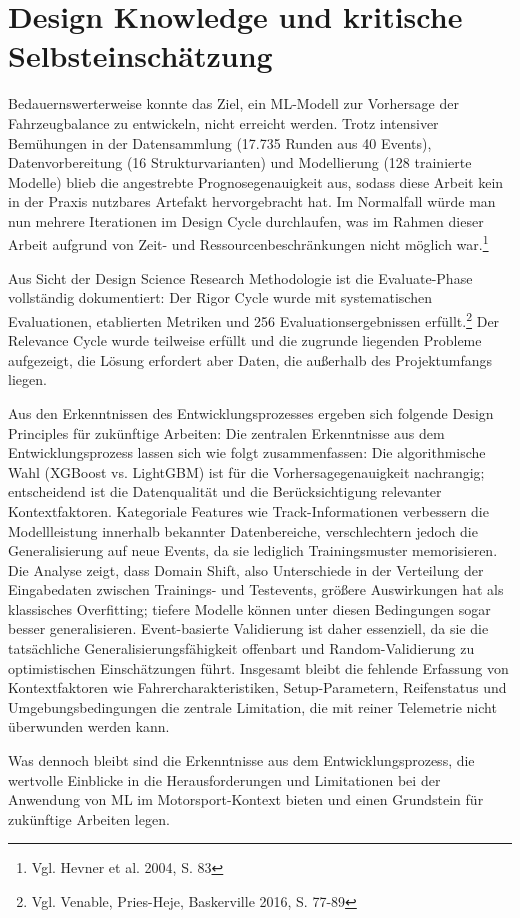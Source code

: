 \section{Design Knowledge und kritische Selbsteinschätzung}

Bedauernswerterweise konnte das Ziel, ein ML-Modell zur Vorhersage der Fahrzeugbalance zu entwickeln, nicht erreicht werden. Trotz intensiver Bemühungen in der Datensammlung (17.735 Runden aus 40 Events), Datenvorbereitung (16 Strukturvarianten) und Modellierung (128 trainierte Modelle) blieb die angestrebte Prognosegenauigkeit aus, sodass diese Arbeit kein in der Praxis nutzbares Artefakt hervorgebracht hat. Im Normalfall würde man nun mehrere Iterationen im Design Cycle durchlaufen, was im Rahmen dieser Arbeit aufgrund von Zeit- und Ressourcenbeschränkungen nicht möglich war.\footnote{Vgl. Hevner et al. 2004, S. 83}

Aus Sicht der Design Science Research Methodologie ist die Evaluate-Phase vollständig dokumentiert: Der Rigor Cycle wurde mit systematischen Evaluationen, etablierten Metriken und 256 Evaluationsergebnissen erfüllt.\footnote{Vgl. Venable, Pries-Heje, Baskerville 2016, S. 77-89} Der Relevance Cycle wurde teilweise erfüllt und die zugrunde liegenden Probleme aufgezeigt, die Lösung erfordert aber Daten, die außerhalb des Projektumfangs liegen.

Aus den Erkenntnissen des Entwicklungsprozesses ergeben sich folgende Design Principles für zukünftige Arbeiten:
Die zentralen Erkenntnisse aus dem Entwicklungsprozess lassen sich wie folgt zusammenfassen: Die algorithmische Wahl (XGBoost vs. LightGBM) ist für die Vorhersagegenauigkeit nachrangig; entscheidend ist die Datenqualität und die Berücksichtigung relevanter Kontextfaktoren. Kategoriale Features wie Track-Informationen verbessern die Modellleistung innerhalb bekannter Datenbereiche, verschlechtern jedoch die Generalisierung auf neue Events, da sie lediglich Trainingsmuster memorisieren. Die Analyse zeigt, dass Domain Shift, also Unterschiede in der Verteilung der Eingabedaten zwischen Trainings- und Testevents, größere Auswirkungen hat als klassisches Overfitting; tiefere Modelle können unter diesen Bedingungen sogar besser generalisieren. Event-basierte Validierung ist daher essenziell, da sie die tatsächliche Generalisierungsfähigkeit offenbart und Random-Validierung zu optimistischen Einschätzungen führt. Insgesamt bleibt die fehlende Erfassung von Kontextfaktoren wie Fahrercharakteristiken, Setup-Parametern, Reifenstatus und Umgebungsbedingungen die zentrale Limitation, die mit reiner Telemetrie nicht überwunden werden kann.

Was dennoch bleibt sind die Erkenntnisse aus dem Entwicklungsprozess, die wertvolle Einblicke in die Herausforderungen und Limitationen bei der Anwendung von ML im Motorsport-Kontext bieten und einen Grundstein für zukünftige Arbeiten legen.
